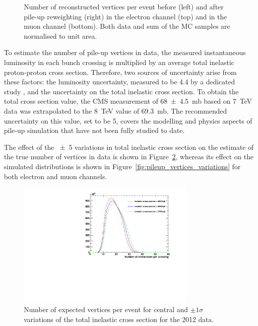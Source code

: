 \begin{figure}[!htpb]
    \caption[Number of reconstructed vertices per event before and after pile-up reweighting]{Number of reconstructed
    vertices per event before (left) and after pile-up reweighting (right) in the electron channel (top) and in the muon
    channel (bottom). Both data and sum of the MC samples are normalised to unit area.}
    \label{fig:pileup_vertices}
\end{figure}

To estimate the number of pile-up vertices in data, the measured instantaneous luminosity in each bunch crossing is
multiplied by an average total inelastic proton-proton cross section. Therefore, two sources of uncertainty arise from
these factors: the luminosity uncertainty, measured to be \SI{4.4}{\pc} by a dedicated study \autocite{CMS_lumi_2012},
and the uncertainty on the total inelastic cross section. To obtain the total cross section value, the CMS measurement
of \SI{68\pm4.5}{\milli\barn} based on \SI{7}{\TeV} data \autocite{CMS_total_inelastic_7TeV} was extrapolated to the
\SI{8}{\TeV} value of \SI{69.3}{\milli\barn}. The recommended uncertainty on this value, set to be \SI{5}{\pc}, covers
the modelling and physics aspects of pile-up simulation that have not been fully studied to date.


The effect of the \SI{\pm5}{\pc} variations in total inelastic cross section on the estimate of the true number of
vertices in data is shown in Figure~\ref{fig:pileup_truth}, whereas its effect on the simulated distributions is shown
in Figure~\ref{fig:pileup_vertices_variations} for both electron and muon channels.

 \begin{figure}[htbp]
   	\centering
    \includegraphics[width=0.77\textwidth]{vertices/PileUp_2012_truth_data.pdf}
    \caption[Number of expected vertices per event for central and $\pm1\sigma$ variations of the total inelastic cross
    section for the 2012 data]{Number of expected vertices per event for central and $\pm1\sigma$ variations of the
    total inelastic cross section for the 2012 data.}
    \label{fig:pileup_truth}
 \end{figure}

